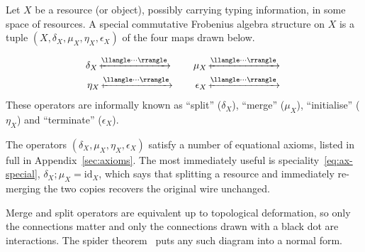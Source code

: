 \begin{definition}
Let $X$ be a resource (or object), possibly carrying typing information, in some space of resources. A special commutative Frobenius algebra structure on $X$ is a tuple $(X,\delta_X,\mu_X,\eta_X,\epsilon_X)$ of the four maps drawn below.
\end{definition}
\begin{align*}
\delta_X
\xmapsto{\llangle \cdot\cdot\cdot \rrangle}
\vcenter{\hbox{\unskip}}
\quad\quad
\mu_X
\xmapsto{\llangle \cdot\cdot\cdot \rrangle}
\vcenter{\hbox{\unskip}}
\\
\eta_X
\xmapsto{\llangle \cdot\cdot\cdot \rrangle}
\vcenter{\hbox{\unskip}}
\quad\quad
\epsilon_X
\xmapsto{\llangle \cdot\cdot\cdot \rrangle}
\vcenter{\hbox{\unskip}}
\end{align*}
\medskip
These operators are informally known as ``split'' ($\delta_X$), ``merge'' ($\mu_X$), ``initialise'' ($\eta_X$) and ``terminate'' ($\epsilon_X$).

The operators $(\delta_X,\mu_X,\eta_X,\epsilon_X)$ satisfy a number of equational axioms, listed in
full in Appendix~\ref{sec:axioms}. The most immediately useful is speciality~\eqref{eq:ax-special},
$\delta_X ; \mu_X = \mathrm{id}_X$, which says that splitting a resource and immediately re-merging
the two copies recovers the original wire unchanged.

Merge and split operators are equivalent up to topological deformation, so only the connections
matter and only the connections drawn with a black dot are interactions. The spider
theorem~\cite{bonchiStringDiagramRewrite2022} puts any such diagram into a normal form.

